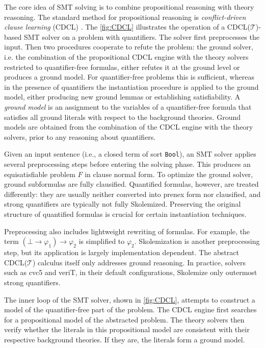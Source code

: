 The core idea of SMT solving is to combine propositional reasoning with theory reasoning.
The standard method for propositional reasoning is \emph{conflict-driven clause learning} (CDCL)  \cite{dpll}.
The \cref{fig:CDCL} illustrates the operation of a CDCL($\mathcal{T}$)-based SMT solver on a problem with quantifiers.
The solver first preprocesses the input.
Then two procedures cooperate to refute the problem: the ground solver, i.e. the combination of the propositional CDCL engine with the theory solvers restricted to quantifier-free formulas, either refutes it at the ground level or produces a ground model.
For quantifier-free problems this is sufficient, whereas in the presence of quantifiers the instantiation procedure is applied to the ground model, either producing new ground lemmas or establishing satisfiability.
A \emph{ground model} is an assignment to the variables of a quantifier-free formula that satisfies all ground literals with respect to the background theories.
Ground models are obtained from the combination of the CDCL engine with the theory solvers, prior to any reasoning about quantifiers.

Given an input sentence (i.e., a closed term of sort \texttt{Bool}), an SMT solver applies several preprocessing steps before entering the solving phase.
This produces an equisatisfiable problem $F$ in clause normal form.
To optimize the ground solver, ground subformulas are fully clausified.
Quantified formulas, however, are treated differently: they are usually neither converted into prenex form nor clausified, and strong quantifiers \cite{BAAZ2001273} are typically not fully Skolemized.
Preserving the original structure of quantified formulas is crucial for certain instantiation techniques.

Preprocessing also includes lightweight rewriting of formulas.
For example, the term $(\bot \to \varphi_1) \to \varphi_2$ is simplified to $\varphi_2$.
Skolemization is another preprocessing step, but its application is largely implementation dependent.
The abstract CDCL($\mathcal{T}$) calculus itself only addresses ground reasoning.
In practice, solvers such as cvc5 and veriT, in their default configurations, Skolemize only outermost strong quantifiers.


The inner loop of the SMT solver, shown in \cref{fig:CDCL}, attempts to construct a model of the quantifier-free part of the problem.
The CDCL engine first searches for a propositional model of the abstracted problem.
The theory solvers then verify whether the literals in this propositional model are consistent with their respective background theories.
If they are, the literals form a ground model.



